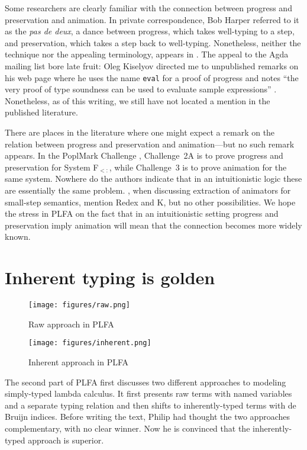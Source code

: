\documentclass[preprint,authoryear]{elsarticle}
\begin{document}
Some researchers are clearly familiar with the connection between
progress and preservation and animation.  In private correspondence,
Bob Harper referred to it as the \emph{pas de deux}, a dance between
progress, which takes well-typing to a step, and preservation, which
takes a step back to well-typing.  Nonetheless, neither the technique
nor the appealing terminology, appears in \citet{Harper-2016}.  The
appeal to the Agda mailing list bore late fruit: Oleg Kiselyov
directed me to unpublished remarks on his web page where he uses the
name \texttt{eval} for a proof of progress and notes ``the very proof
of type soundness can be used to evaluate sample expressions''
\citep{Kiselyov-2009}.  Nonetheless, as of this writing, we still have
not located a mention in the published literature.

There are places in the literature where one might expect a remark on
the relation between progress and preservation and animation---but no
such remark appears.  In the PoplMark Challenge
\citep{Ayedemir-et-al-2005}, Challenge~2A is to prove progress and
preservation for System F$_{<:}$, while Challenge~3 is to prove
animation for the same system. Nowhere do the authors indicate that in
an intuitionistic logic these are essentially the same problem.
\cite{Owens-et-al-2016}, when discussing extraction of animators for
small-step semantics, mention Redex and K, but no other possibilities.
We hope the stress in PLFA on the fact that in an intuitionistic
setting progress and preservation imply animation will mean that the
connection becomes more widely known.






\section{Inherent typing is golden}

\begin{figure}[p]
  \texttt{[image: figures/raw.png]}
  \caption{Raw approach in PLFA}
  \label{fig:raw}
\end{figure}  

\begin{figure}[t]
  \texttt{[image: figures/inherent.png]}
  \caption{Inherent approach in PLFA}
  \label{fig:inherent}
\end{figure}  

The second part of PLFA first discusses two different approaches to
modeling simply-typed lambda calculus.  It first presents raw
terms with named variables and a separate typing relation and
then shifts to inherently-typed terms with de Bruijn indices.
Before writing the text, Philip had thought the two approaches
complementary, with no clear winner.  Now he is convinced that the
inherently-typed approach is superior.
\end{document}
